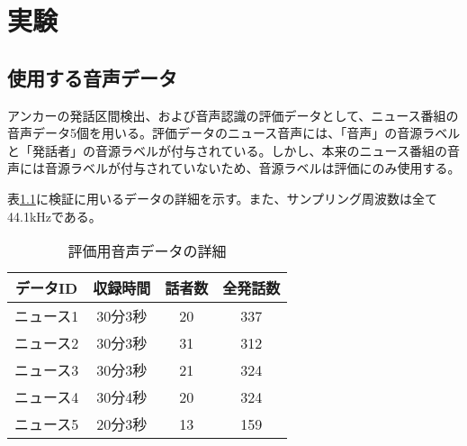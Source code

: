 \chapter{実験}
\section{使用する音声データ}
\label{section:test_audio}
アンカーの発話区間検出、および音声認識の評価データとして、ニュース番組の音声データ5個を用いる。評価データのニュース音声には、「音声」の音源ラベルと「発話者」の音源ラベルが付与されている。しかし、本来のニュース番組の音声には音源ラベルが付与されていないため、音源ラベルは評価にのみ使用する。\par
表\ref{table:test_detail}に検証に用いるデータの詳細を示す。また、サンプリング周波数は全て44.1kHzである。

\begin{table}[H]
  \begin{center}
    \caption{評価用音声データの詳細 \label{table:test_detail}}
    \begin{tabular}{|c||c|c|c|} \hline
      データID & 収録時間 & 話者数 & 全発話数 \\ \hline
      ニュース1 & 30分3秒 & 20 & 337 \\ \hline
      ニュース2 & 30分3秒 & 31 & 312\\ \hline
      ニュース3 & 30分3秒 & 21 & 324 \\ \hline
      ニュース4 & 30分4秒 & 20 & 324\\ \hline
      ニュース5 & 20分3秒 & 13 & 159\\ \hline
    \end{tabular}
  \end{center}
\end{table}




